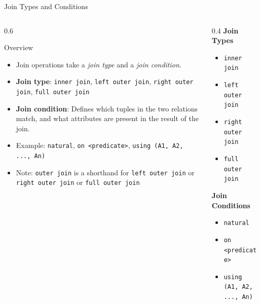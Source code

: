 \documentclass[aspectratio=169, xcolor=dvipsnames]{beamer}
\begin{document}
\begin{frame}{Join Types and Conditions}
    \begin{columns}
        \begin{column}{0.6\textwidth}
            \begin{block}{Overview}
                \begin{itemize}[<+->]
                    \item Join operations take a \textit{join type} and a \textit{join condition}.
                    \item \textbf{Join type}: \texttt{inner join}, \texttt{left outer join}, \texttt{right outer join}, \texttt{full outer join}
                    \item \textbf{Join condition}: Defines which tuples in the two relations match, and what attributes are present in the result of the join.
                    \item Example: \texttt{natural}, \texttt{on <predicate>}, \texttt{using (A1, A2, ..., An)}
                    \item Note: \texttt{outer join} is a shorthand for \texttt{left outer join} or \texttt{right outer join} or \texttt{full outer join}
                \end{itemize}
            \end{block}
        \end{column}
        \begin{column}{0.4\textwidth}
            \textbf{Join Types}
            \begin{itemize}
                \item \texttt{inner join}
                \item \texttt{left outer join}
                \item \texttt{right outer join}
                \item \texttt{full outer join}
            \end{itemize}
            \vspace{1em}
            \textbf{Join Conditions}
            \begin{itemize}
                \item \texttt{natural}
                \item \texttt{on <predicate>}
                \item \texttt{using (A1, A2, ..., An)}
            \end{itemize}
        \end{column}
    \end{columns}
\end{frame}
\end{document}
